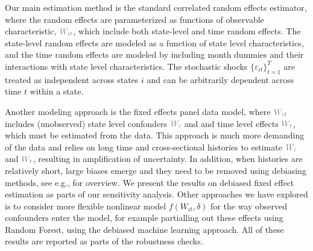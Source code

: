 \documentclass[11pt,reqno,letter]{amsart}
\theoremstyle{definition}
\def\wcolor{\color{gray}}
\begin{document}
Our main estimation method is the standard correlated random effects estimator, where the random effects
are parameterized as functions of observable characteristic, ${\wcolor W_{it}}$, which include both state-level and time random effects.  The state-level random effects
are modeled as a function of state level characteristics, and the time random effects are modeled
by including month dummies and their interactions with state level characteristics.  The stochastic shocks $\{ \varepsilon_{it}\}_{t=1}^T$ are treated as independent across states $i$ and can be arbitrarily dependent across time $t$ within a state.

Another modeling approach is the fixed effects panel data model, where ${\wcolor W_{it}}$ includes
 (unobserved) state level confonders ${\wcolor W_i}$ and  and time level effects ${\wcolor W_t}$,
which must be estimated from the data.  This approach is much more demanding of the data and relies on long time and cross-sectional histories to estimate ${\wcolor W_i}$ and ${\wcolor W_t}$, resulting in amplification of uncertainty. In addition, when histories are relatively short,  large biases emerge and they need to be removed using debiasing methods, see e.g., \cite{chen2019mastering} for overview. We present the results
on debiased fixed effect estimation as parts of our sensitivity analysis. Other approaches we have explored
is to consider more flexible nonlinear model $f(W_{it}, \delta)$ for the way observed confounders enter the model,
for example partialling out these effects using Random Forest, using the debiased machine learning approach.
All of these results are reported as parts of the robustness checks.
\end{document}
